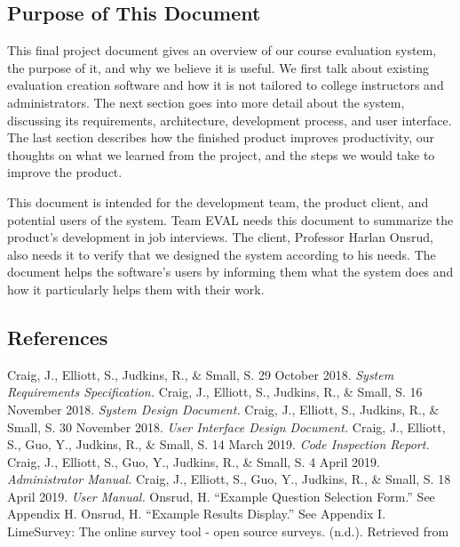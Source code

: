 \documentclass{article}
\begin{document}
\subsection{Purpose of This Document}

This final project document gives an overview of our course evaluation system, the purpose of it, and why we believe it is useful. We first talk about existing evaluation creation software and how it is not tailored to college instructors and administrators. The next section goes into more detail about the system, discussing its requirements, architecture, development process, and user interface. The last section describes how the finished product improves productivity, our thoughts on what we learned from the project, and the steps we would take to improve the product.

This document is intended for the development team, the product client, and potential users of the system. Team EVAL needs this document to summarize the product's development in job interviews. The client, Professor Harlan Onsrud, also needs it to verify that we designed the system according to his needs. The document helps the software's users by informing them what the system does and how it particularly helps them with their work.

\subsection{References}

Craig, J., Elliott, S., Judkins, R., \& Small, S. 29 October 2018. \textit{System Requirements Specification.}
\vspace{3mm}\newline
Craig, J., Elliott, S., Judkins, R., \& Small, S. 16 November 2018. \textit{System Design Document.}
\vspace{3mm}\newline
Craig, J., Elliott, S., Judkins, R., \& Small, S. 30 November 2018. \textit{User Interface Design Document.}
\vspace{3mm}\newline
Craig, J., Elliott, S., Guo, Y., Judkins, R., \& Small, S. 14 March 2019. \textit{Code Inspection Report.}
\vspace{3mm}\newline
Craig, J., Elliott, S., Guo, Y., Judkins, R., \& Small, S. 4 April 2019. \textit{Administrator Manual.}
\vspace{3mm}\newline
Craig, J., Elliott, S., Guo, Y., Judkins, R., \& Small, S. 18 April 2019. \textit{User Manual.}
\vspace{3mm}\newline
Onsrud, H. ``Example Question Selection Form.'' See Appendix H.
\vspace{3mm}\newline
Onsrud, H. ``Example Results Display.'' See Appendix I.
\vspace{3mm}\newline
LimeSurvey: The online survey tool - open source surveys. (n.d.). Retrieved from
\end{document}
